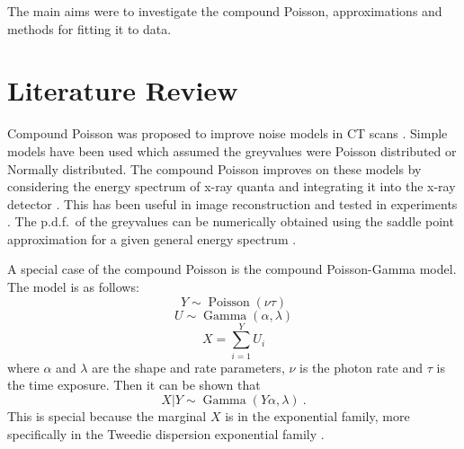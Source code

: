 \documentclass[a4paper]{proc}
\DeclareMathOperator{\gammaDist}{Gamma}
\DeclareMathOperator{\poisson}{Poisson}
\begin{document}
The main aims were to investigate the compound Poisson, approximations and methods for fitting it to data.

\section{Literature Review}
Compound Poisson was proposed to improve noise models in CT scans \cite{whiting2002signal}. Simple models have been used which assumed the greyvalues were Poisson distributed or Normally \cite{lu2002analytical} distributed. The compound Poisson improves on these models by considering the energy spectrum of x-ray quanta and integrating it into the x-ray detector \cite{whiting2006properties}. This has been useful in image reconstruction \cite{elbakri2003efficient}\cite{elbakri2002statistical}\cite{elbakri2001statistical}\cite{lasio2007statistical} and tested in experiments \cite{wang2008experimental}. The p.d.f.~of the greyvalues can be numerically obtained using the saddle point approximation for a given general energy spectrum \cite{elbakri2003efficient}.

A special case of the compound Poisson is the compound Poisson-Gamma model. The model is as follows:
\begin{equation}
Y\sim\poisson\left(\nu\tau\right)
\end{equation}
\begin{equation}
U\sim\gammaDist\left(\alpha,\lambda\right)
\end{equation}
\begin{equation}
X = \sum_{i=1}^Y U_i
\end{equation}
where $\alpha$ and $\lambda$ are the shape and rate parameters, $\nu$ is the photon rate and $\tau$ is the time exposure. Then it can be shown that
\begin{equation}
X|Y\sim\gammaDist\left(Y\alpha,\lambda\right) \ .
\end{equation}
This is special because the marginal $X$ is in the exponential family, more specifically in the Tweedie dispersion exponential family \cite{jorgensen1987exponential}.
\end{document}
